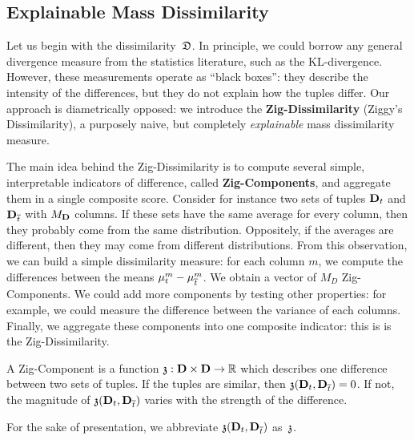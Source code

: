 \subsection{Explainable Mass Dissimilarity}
\label{sec:explain}
Let us begin with the dissimilarity~$\mathfrak{D}$. In principle, we could
borrow any general divergence measure from the statistics literature, such
as the KL-divergence. However, these measurements operate as ``black boxes'':
they describe the intensity of the differences, but they do not explain how the
tuples differ. Our approach is diametrically opposed: we introduce the
\textbf{Zig-Dissimilarity} (Ziggy's Dissimilarity), a purposely naive, but
completely \emph{explainable}  mass dissimilarity measure.

The main idea behind the Zig-Dissimilarity is to compute several simple,
interpretable indicators of difference, called \textbf{Zig-Components}, and
aggregate them in a single composite score.  Consider for instance two sets of
tuples $\mathbf{D}_t$ and $\mathbf{D}_{\overline{t}}$ with $M_\rb{D}$ columns. If these sets
have the same average for every column, then they probably come from the same
distribution. Oppositely, if the averages are different, then they may come
from different distributions. From this observation, we can build a simple
dissimilarity measure: for each column $m$, we compute the differences between
the means $\mu^m_t - \mu^m_{\overline{t}}$. We obtain a vector of $M_D$
Zig-Components. We could add more components by testing other properties: for
example, we could measure the difference between the variance of each columns.
Finally, we aggregate these components into one composite indicator: this is is the
Zig-Dissimilarity.

\begin{definition}
    A Zig-Component is a function $\mathfrak{z} : \mathbf{D}\times\mathbf{D} \to \mathbb{R}$
    which describes one difference between two sets of tuples. If the tuples
    are similar, then $\mathfrak{z}(\mathbf{D}_t, \mathbf{D}_{\overline{t}}) = 0$. If not,
    the magnitude of $\mathfrak{z}(\mathbf{D}_t, \mathbf{D}_{\overline{t}})$ varies with the strength
    of the difference.
\end{definition}
For the sake of presentation, we  abbreviate $\mathfrak{z}(\mathbf{D}_t, \mathbf{D}_{\overline{t}})$ as~$\mathfrak{z}$.

